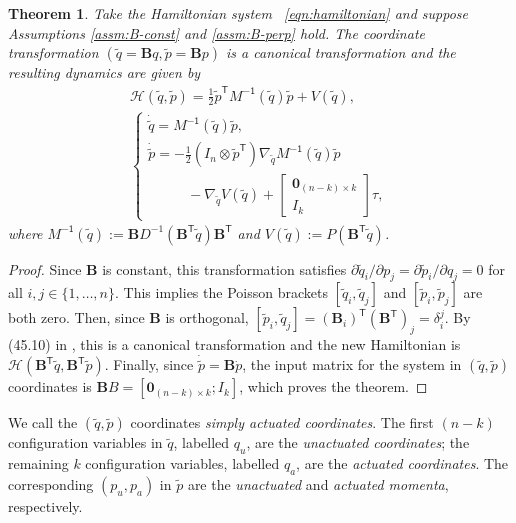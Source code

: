 \documentclass[journal,twoside,web]{ieeecolor}
\newtheorem{thm}{Theorem}%
\newcommand*{\tpose}{^\mathsf{T}}
\newcommand*{\Minv}{M^\mathsf{-1}}
\newcommand*{\Id}[1]{I_{#1}}
\newcommand*{\Zmat}[1]{\bm{0}_{#1}}
\newcommand*{\simpleB}{\begin{bmatrix}\Zmat{(n-k)\times k}\\ \Id{k}\end{bmatrix}}
\begin{document}
\begin{thm}\label{thm:simply-actuated}
    Take the Hamiltonian system ~\eqref{eqn:hamiltonian} and suppose
    Assumptions \ref{assm:B-const} and \ref{assm:B-perp} hold.
    The coordinate transformation
    \(\left(\tilde{q} = \mathbf{B}q, \tilde{p} = \mathbf{B}p\right)\)
    is a canonical transformation and the resulting dynamics are given by 
    \begin{gather}\label{eqn:simple-hamiltonian}
        \mathcal{H}(\tilde{q},\tilde{p}) = 
        \frac{1}{2} \tilde{p}\tpose \Minv(\tilde{q}) \tilde{p} + V(\tilde{q})
        , \\
       \begin{cases}
           \dot{\tilde{q}} = \Minv(\tilde{q})\tilde{p}
           , \\
           \dot{\tilde{p}} = -\frac{1}{2} (\Id{n} \otimes \tilde{p}\tpose)
           \nabla_{\tilde{q}} \Minv(\tilde{q}) \tilde{p} \\
           \phantom{---} - \nabla_{\tilde{q}} V(\tilde{q}) + \simpleB \tau
            ,
        \end{cases} \nonumber
    \end{gather}
    where 
    \(\Minv(\tilde{q}) := 
    \mathbf{B}D^{-1}(\mathbf{B}\tpose \tilde{q})\mathbf{B}\tpose\)
    and
    \(V(\tilde{q}) := P(\mathbf{B}\tpose \tilde{q})\).
\end{thm}
\begin{proof}
    Since \(\mathbf{B}\) is constant, this transformation satisfies
    \(\partial\tilde{q}_i/\partial p_j = \partial\tilde{p}_i/\partial q_j = 0\) for all 
    \(i,j \in \{1,\ldots,n\}\).
    This implies the Poisson brackets \([\tilde{q}_i, \tilde{q}_j]\)
    and \([\tilde{p}_i,\tilde{p}_j]\) are both zero.
    Then, since \(\mathbf{B}\) is orthogonal, 
    \([\tilde{p}_i, \tilde{q}_j] = (\mathbf{B}_i)\tpose (\mathbf{B}\tpose)_j
        = \delta_i^j\).
    By (45.10) in \cite{landau_mechanics}, this is a canonical transformation
    and the new Hamiltonian is
    \(\mathcal{H}(\mathbf{B}\tpose \tilde{q}, \mathbf{B}\tpose \tilde{p})\).
    Finally, since \(\dot{\tilde{p}} = \mathbf{B} \dot{p}\), the input
    matrix for the system in \((\tilde{q},\tilde{p})\) coordinates is
    \(\mathbf{B}B = [\Zmat{(n-k)\times k}; \Id{k}]\), which proves the theorem.
\end{proof}

We call the \((\tilde{q},\tilde{p})\) coordinates
\textit{simply actuated coordinates}.
The first \((n-k)\) configuration variables in \(\tilde{q}\), labelled \(q_u\),
are the \textit{unactuated coordinates}; 
the remaining \(k\) configuration variables, labelled \(q_a\), are the
\textit{actuated coordinates}.
The corresponding \((p_u, p_a)\) in \(\tilde{p}\) are the \textit{unactuated}
and \textit{actuated momenta}, respectively.
\end{document}
